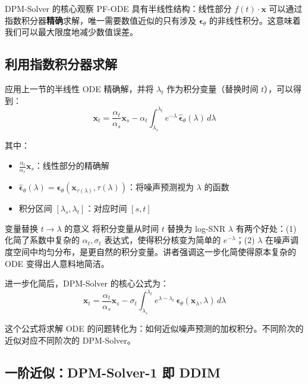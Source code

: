 \documentclass[a4paper]{article}
\begin{document}
\begin{importantbox}{DPM-Solver 的核心观察}
PF-ODE 具有半线性结构：线性部分 $f(t) \cdot \mathbf{x}$ 可以通过指数积分器\textbf{精确}求解，唯一需要数值近似的只有涉及 $\boldsymbol{\epsilon}_\theta$ 的非线性积分。这意味着我们可以最大限度地减少数值误差。
\end{importantbox}

\subsection{利用指数积分器求解}

应用上一节的半线性 ODE 精确解，并将 $\lambda_t$ 作为积分变量（替换时间 $t$），可以得到：
$$\mathbf{x}_t = \frac{\alpha_t}{\alpha_s} \mathbf{x}_s - \alpha_t \int_{\lambda_s}^{\lambda_t} e^{-\lambda}\, \hat{\boldsymbol{\epsilon}}_\theta(\lambda)\, d\lambda$$

其中：
\begin{itemize}
    \item $\frac{\alpha_t}{\alpha_s} \mathbf{x}_s$：线性部分的精确解
    \item $\hat{\boldsymbol{\epsilon}}_\theta(\lambda) = \boldsymbol{\epsilon}_\theta(\mathbf{x}_{\tau(\lambda)}, \tau(\lambda))$：将噪声预测视为 $\lambda$ 的函数
    \item 积分区间 $[\lambda_s, \lambda_t]$：对应时间 $[s, t]$
\end{itemize}

\begin{knowledgebox}{变量替换 $t \to \lambda$ 的意义}
将积分变量从时间 $t$ 替换为 log-SNR $\lambda$ 有两个好处：(1) 化简了系数中复杂的 $\alpha_t, \sigma_t$ 表达式，使得积分核变为简单的 $e^{-\lambda}$；(2) $\lambda$ 在噪声调度空间中均匀分布，是更自然的积分变量。讲者强调这一步化简使得原本复杂的 ODE 变得出人意料地简洁。
\end{knowledgebox}

进一步化简后，DPM-Solver 的核心公式为：
$$\mathbf{x}_t = \frac{\alpha_t}{\alpha_s} \mathbf{x}_s - \sigma_t \int_{\lambda_s}^{\lambda_t} e^{\lambda - \lambda_t}\, \boldsymbol{\epsilon}_\theta(\mathbf{x}_\lambda, \lambda)\, d\lambda$$

这个公式将求解 ODE 的问题转化为：如何近似噪声预测的加权积分。不同阶次的近似对应不同阶次的 DPM-Solver。

\subsection{一阶近似：DPM-Solver-1 即 DDIM}
\end{document}
